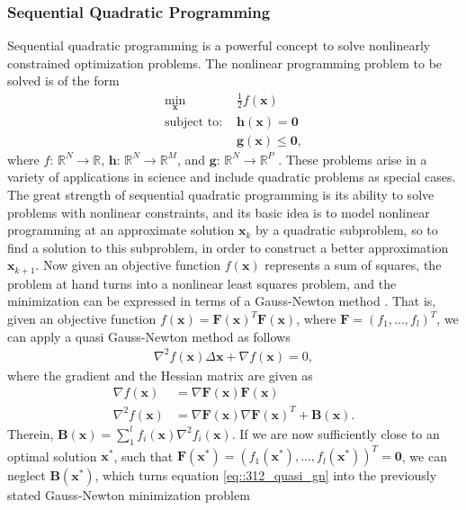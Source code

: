 \subsubsection{Sequential Quadratic Programming}
\label{sec::312_sqp}
Sequential quadratic programming is a powerful concept to solve nonlinearly constrained optimization problems. The nonlinear programming problem to be solved is of the form
\begin{align}
	\min_{\bm{x}}\, &\frac{1}{2}f(\bm{x})
	\label{eq::312_objective}\\
	\text{subject to: } &\bm{h}(\bm{x}) = \bm{0}\\
	&\bm{g}(\bm{x}) \leq \bm{0},
\end{align}
where $f:\,\mathbb{R}^N\rightarrow\mathbb{R}$, $\bm{h}:\,\mathbb{R}^N\rightarrow\mathbb{R}^M$, and $\bm{g}:\,\mathbb{R}^N\rightarrow\mathbb{R}^P$ \cite{boggs1995sequential}. These problems arise in a variety of applications in science and include quadratic problems as special cases. The great strength of sequential quadratic programming is its ability to solve problems with nonlinear constraints, and its basic idea is to model nonlinear programming at an approximate solution $\bm{x}_k$ by a quadratic subproblem, so to find a solution to this subproblem, in order to construct a better approximation $\bm{x}_{k+1}$. Now given an objective function $f(\bm{x})$ represents a sum of squares, the problem at hand turns into a nonlinear least squares problem, and the minimization can be expressed in terms of a Gauss-Newton method \cite{schittkowski1988solving}. That is, given an objective function $f(\bm{x}) = \bm{F}(\bm{x})^T\bm{F}(\bm{x})$, where $\bm{F}=\left(f_1,...,f_l\right)^T$, we can apply a quasi Gauss-Newton method as follows
\begin{align}
	\nabla^2f(\bm{x})\Delta\bm{x} + \nabla f(\bm{x}) = 0,
	\label{eq::312_quasi_gn}
\end{align}
where the gradient and the Hessian matrix are given as
\begin{align}
	\nabla f(\bm{x}) &= \nabla \bm{F}(\bm{x})\bm{F}(\bm{x}) \\
	\nabla^2 f(\bm{x}) &= \nabla \bm{F}(\bm{x})\nabla\bm{F}(\bm{x})^T + \bm{B}(\bm{x}).
\end{align}
Therein, $\bm{B}(\bm{x}) = \sum_1^lf_i(\bm{x})\nabla^2f_i(\bm{x})$. If we are now sufficiently close to an optimal solution $\bm{x}^*$, such that $\bm{F}(\bm{x}^*) = \left(f_1(\bm{x}^*),...,f_l(\bm{x}^*)\right)^T=\bm{0}$, we can neglect $\bm{B}(\bm{x^*})$, which turns equation \ref{eq::312_quasi_gn} into the previously stated Gauss-Newton minimization problem
